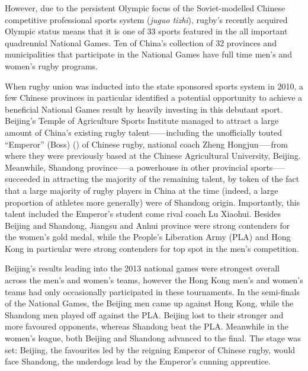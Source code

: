 However, due to the persistent Olympic focus of the Soviet-modelled Chinese competitive professional sports system (\textit{juguo tizhi}), rugby's recently acquired Olympic status means that it is one of 33 sports featured in the all important quadrennial National Games.  Ten of China's collection of 32 provinces and municipalities that participate in the National Games have full time men's and women's rugby programs.


When rugby union was inducted into the state sponsored sports system in 2010, a few Chinese provinces in particular identified a potential opportunity to achieve a beneficial National Games result by heavily investing in this debutant sport.  Beijing's Temple of Agriculture Sports Institute managed to attract a large amount of China's existing rugby talent—---including the unofficially touted ``Emperor'' (Boss) (\citep{huangdi}) of Chinese rugby, national coach Zheng Hongjun—--from where they were previously based at the Chinese Agricultural University, Beijing.  Meanwhile, Shandong province—--a powerhouse in other provincial sports--—succeeded in attracting the majority of the remaining talent, by token of the fact that a large majority of rugby players in China at the time (indeed, a large proportion of athletes more generally) were of Shandong origin.  Importantly, this talent included the Emperor's student come rival coach Lu Xiaohui.  Besides Beijing and Shandong, Jiangsu and Anhui province were strong contenders for the women's gold medal, while the People's Liberation Army (PLA) and Hong Kong in particular were strong contenders for top spot in the men's competition.

Beijing's results leading into the 2013 national games were strongest overall across the men's and women's teams, however the Hong Kong men's and women's teams had only occasionally participated in these tournaments.  In the semi-finals of the National Games, the Beijing men came up against Hong Kong, while the Shandong men played off against the PLA.  Beijing lost to their stronger and more favoured opponents, whereas Shandong beat the PLA.  Meanwhile in the women's league, both Beijing and Shandong advanced to the final.  The stage was set: Beijing, the favourites led by the reigning Emperor of Chinese rugby, would face Shandong, the underdogs lead by the Emperor's cunning apprentice.


